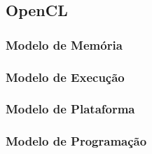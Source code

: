 \subsection{OpenCL}
\subsubsection{Modelo de Memória}
\subsubsection{Modelo de Execução}
\subsubsection{Modelo de Plataforma}
\subsubsection{Modelo de Programação}
